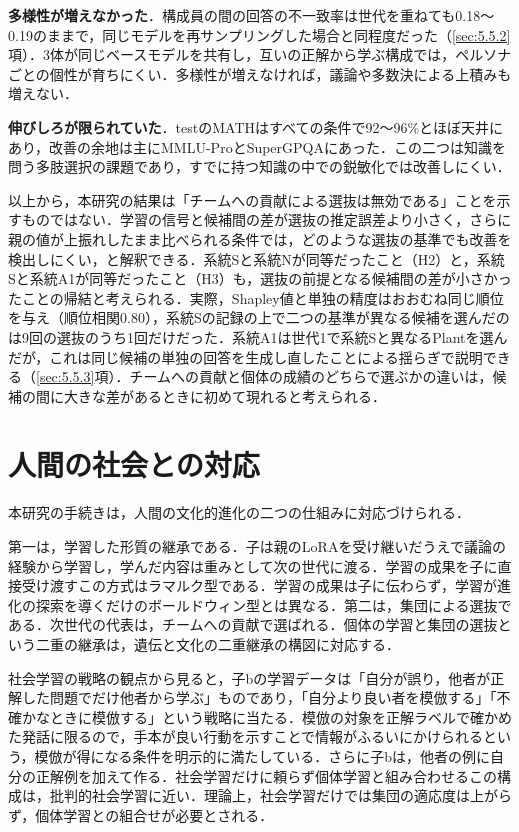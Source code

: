 \textbf{多様性が増えなかった}．構成員の間の回答の不一致率は世代を重ねても0.18〜0.19のままで，同じモデルを再サンプリングした場合と同程度だった（\ref{sec:5.5.2}項）．3体が同じベースモデルを共有し，互いの正解から学ぶ構成では，ペルソナごとの個性が育ちにくい\cite{roe2026idempotent}．多様性が増えなければ，議論や多数決による上積みも増えない．

\textbf{伸びしろが限られていた}．testのMATHはすべての条件で92〜96\%とほぼ天井にあり，改善の余地は主にMMLU-ProとSuperGPQAにあった．この二つは知識を問う多肢選択の課題であり，すでに持つ知識の中での鋭敏化では改善しにくい．

以上から，本研究の結果は「チームへの貢献による選抜は無効である」ことを示すものではない．学習の信号と候補間の差が選抜の推定誤差より小さく，さらに親の値が上振れしたまま比べられる条件では，どのような選抜の基準でも改善を検出しにくい，と解釈できる．系統Sと系統Nが同等だったこと（H2）と，系統Sと系統A1が同等だったこと（H3）も，選抜の前提となる候補間の差が小さかったことの帰結と考えられる．実際，Shapley値と単独の精度はおおむね同じ順位を与え（順位相関0.80），系統Sの記録の上で二つの基準が異なる候補を選んだのは9回の選抜のうち1回だけだった．系統A1は世代1で系統Sと異なるPlantを選んだが，これは同じ候補の単独の回答を生成し直したことによる揺らぎで説明できる（\ref{sec:5.5.3}項）．チームへの貢献と個体の成績のどちらで選ぶかの違いは，候補の間に大きな差があるときに初めて現れると考えられる．

\section{人間の社会との対応}
\label{sec:6.2}

本研究の手続きは，人間の文化的進化の二つの仕組みに対応づけられる．

第一は，学習した形質の継承である．子は親のLoRAを受け継いだうえで議論の経験から学習し，学んだ内容は重みとして次の世代に渡る．学習の成果を子に直接受け渡すこの方式はラマルク型である\cite{whitley1994lamarckian}．学習の成果は子に伝わらず，学習が進化の探索を導くだけのボールドウィン型\cite{hinton1987learning}とは異なる．第二は，集団による選抜である．次世代の代表は，チームへの貢献で選ばれる．個体の学習と集団の選抜という二重の継承は，遺伝と文化の二重継承の構図\cite{boyd1985culture}に対応する．

社会学習の戦略の観点から見ると，子bの学習データは「自分が誤り，他者が正解した問題でだけ他者から学ぶ」ものであり，「自分より良い者を模倣する」「不確かなときに模倣する」という戦略\cite{laland2004social}に当たる．模倣の対象を正解ラベルで確かめた発話に限るので，手本が良い行動を示すことで情報がふるいにかけられるという，模倣が得になる条件\cite{rendell2010copy}を明示的に満たしている．さらに子bは，他者の例に自分の正解例を加えて作る．社会学習だけに頼らず個体学習と組み合わせるこの構成は，批判的社会学習\cite{enquist2007critical}に近い．理論上，社会学習だけでは集団の適応度は上がらず，個体学習との組合せが必要とされる．

